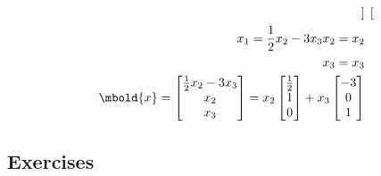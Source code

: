 \documentclass[12pt letter]{report}
\begin{document}
{{\begin{align*}
\begin{bmatrix}
      \end{bmatrix}
      \\
      x_1 = \frac{1}{2}x_2 - 3x_3
      x_2 = x_2                                                                                         \\
      x_3 = x_3
      \\
      \mbold{x} = \begin{bmatrix} \frac{1}{2}x_2 - 3x_3 \\ x_2 \\ x_3 \end{bmatrix} = x_2\begin{bmatrix} \frac{1}{2} \\
                                                                                           1           \\ 0\end{bmatrix} + x_3 \begin{bmatrix} -3 \\ 0 \\ 1 \end{bmatrix}
    \end{align*}
  }
}


\subsection{Exercises}

\end{document}
